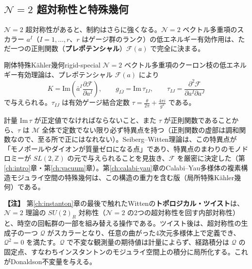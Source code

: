 \documentclass[uplatex, dvipdfmx, book]{jsbook}
\let\origsubsection\subsection
\let\origsubsubsection\subsubsection
\renewcommand{\section}{\origsubsection}
\renewcommand{\subsection}{\origsubsubsection}
\renewcommand{\subsubsection}{\paragraph}
\newenvironment{note}{\vspace{1ex}\par\footnotesize\noindent\textbf{【注】}}{\par\vspace{1ex}}
\begin{document}
\section{$\mathcal{N} = 2$ 超対称性と特殊幾何}

$\mathcal{N} = 2$ 超対称性があると、制約はさらに強くなる。$\mathcal{N} = 2$ ベクトル多重項のスカラー $a^I$（$I = 1, \dots, r$、$r$ はゲージ群のランク）の低エネルギー有効作用は、ただ一つの正則関数（\textbf{プレポテンシャル}）$\mathcal{F}(a)$ で完全に決まる。

\begin{myprop}{剛体特殊K\"ahler幾何}{rigid-special}
$\mathcal{N} = 2$ ベクトル多重項のクーロン枝の低エネルギー有効理論は、プレポテンシャル $\mathcal{F}(a)$ により
\begin{equation*}
    K = \mathrm{Im}\left( \bar{a}^I \frac{\partial\mathcal{F}}{\partial a^I} \right), \qquad
    g_{I\bar J} = \mathrm{Im}\,\tau_{IJ}, \qquad
    \tau_{IJ} = \frac{\partial^2\mathcal{F}}{\partial a^I \partial a^J}
\end{equation*}
で与えられる。$\tau_{IJ}$ は有効ゲージ結合定数 $\tau = \frac{\theta}{2\pi} + \frac{4\pi i}{g^2}$ である。
\end{myprop}

計量 $\mathrm{Im}\,\tau$ が正定値でなければならないこと、また $\tau$ が正則関数であることから、$\tau$ は $\mathcal{M}$ 全体で定数でない限り必ず特異点を持つ（正則関数の虚部は調和関数なので、至る所で正にはなれない）。Seiberg--Witten理論\cite{seibergwitten1994}は、この特異点が「モノポールやダイオンが質量ゼロになる点」であり、特異点のまわりのモノドロミーが $SL(2, \mathbb{Z})$ の元で与えられることを見抜き、$\mathcal{F}$ を厳密に決定した（第\ref{ch:intro}章・第\ref{ch:vacuum}章）。第\ref{ch:calabi-yau}章のCalabi--Yau多様体の複素構造モジュライ空間の特殊幾何は、この構造の重力を含む版（局所特殊K\"ahler幾何）である。

\begin{note}
第\ref{ch:instanton}章の最後で触れたWittenの\textbf{トポロジカル・ツイスト}は、$\mathcal{N} = 2$ 理論の $SU(2)_R$ 対称性（$\mathcal{N} = 2$ の2つの超対称性を回す内部対称性）と、時空の回転群の一部を組み替える操作である。ツイスト後は、超対称性の生成子の一つ $\mathcal{Q}$ がスカラーとなり、任意の曲がった4次元多様体上で定義でき、$\mathcal{Q}^2 = 0$ を満たす。$\mathcal{Q}$ で不変な観測量の期待値は計量によらず、経路積分は $\mathcal{Q}$ の固定点、すなわちインスタントンのモジュライ空間上の積分に局所化する。これがDonaldson不変量を与える。
\end{note}
\end{document}
